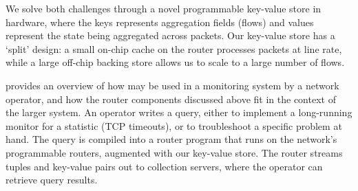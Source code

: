 We solve both challenges through a novel programmable key-value store in
hardware, where the keys represents aggregation fields (\eg flows) and values
represent the state being aggregated across packets. Our key-value store has a
`split' design: a small on-chip cache on the router processes packets at line
rate, while a large off-chip backing store allows us to scale to a large number
of flows.

 provides an overview of how \TheSystem may be used in a
monitoring system by a network operator, and how the router components discussed above
fit in the context of the larger system. An operator writes a \TheSystem query,
either to implement a long-running monitor for a statistic (\eg TCP timeouts),
or to troubleshoot a specific problem at hand. The query is compiled into a
router program that runs on the network's programmable routers, augmented with
our key-value store. The router streams tuples and key-value pairs out to
collection servers, where the operator can retrieve query results.
